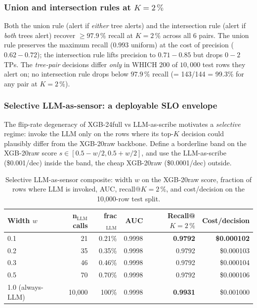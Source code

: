 \subsubsection{Union and intersection rules at $K{=}2\,\%$}\label{sec:p8-decision-disagreement-rules}

Both the union rule (alert if \emph{either} tree alerts) and the
intersection rule (alert if \emph{both} trees alert) recover
$\geq 97.9\,\%$ recall at $K{=}2\,\%$ across all 6 pairs. The
union rule preserves the maximum recall ($0.993$ uniform) at the
cost of precision ($0.62{-}0.72$); the intersection rule lifts
precision to $0.71{-}0.85$ but drops $0{-}2$ TPs. The
\emph{tree-pair} decisions differ \emph{only} in WHICH $200$ of
$10{,}000$ test rows they alert on; no intersection rule drops below
$97.9\,\%$ recall (= 143/144 = 99.3\% for any pair at $K{=}2\,\%$).

\subsubsection{Selective LLM-as-sensor: a deployable SLO envelope}\label{sec:p8-decision-disagreement-selective}

The flip-rate degeneracy of XGB-24full vs LLM-as-scribe motivates a
\emph{selective} regime: invoke the LLM only on the rows where its
top-$K$ decision could plausibly differ from the XGB-20raw
backbone. Define a borderline band on the XGB-20raw score
$s \in [0.5 - w/2, 0.5 + w/2]$, and use the LLM-as-scribe
(\$0.001/dec) inside the band, the cheap XGB-20raw (\$0.0001/dec)
outside.

\begin{table}[t]
\centering\small
\caption{Selective LLM-as-sensor composite: width $w$ on the XGB-20raw
score, fraction of rows where LLM is invoked, AUC, recall@$K{=}2\,\%$,
and cost/decision on the 10,000-row test split.}
\label{tab:p8-decision-disagreement-selective}
\begin{tabular}{lrrrrr}
\toprule
Width $w$ & n$_\text{LLM}$ calls & frac$_\text{LLM}$ & AUC &
Recall@$K{=}2\,\%$ & Cost/decision \\
\midrule
0.1 & 21 & 0.21\% & 0.9998 & \textbf{0.9792} & \textbf{\$0.000102} \\
0.2 & 35 & 0.35\% & 0.9998 & 0.9792 & \$0.000103 \\
0.3 & 46 & 0.46\% & 0.9998 & 0.9792 & \$0.000104 \\
0.5 & 70 & 0.70\% & 0.9998 & 0.9792 & \$0.000106 \\
1.0 (always-LLM) & 10{,}000 & 100\% & 0.9998 & \textbf{0.9931} & \$0.001000 \\
\bottomrule
\end{tabular}
\end{table}

